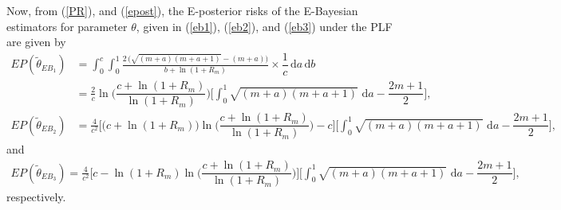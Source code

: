 \documentclass[twoside]{article}
\begin{document}
 Now, from (\ref{PR}), and (\ref{epost}), the E-posterior risks of the E-Bayesian estimators for parameter $\theta$, given in (\ref{eb1}), (\ref{eb2}), and (\ref{eb3}) under the PLF are given by
		\begin{align*}\nonumber
	 EP(\widetilde{\theta}_{EB_1})&=\int_0^c \int_0^1 \frac{2\, \big(\sqrt{(m+a)(m+a+1)}-(m+a)\big)}{b+\ln(1+R_m)}\times  \dfrac{1}{c} \,\mathrm{d}a \, \mathrm{d}b 
	\\&=\frac{2}{c}\ln\bigg(\dfrac{c+\ln(1+R_m)}{\ln(1+R_m)}\bigg) \bigg[\int_0^1   \sqrt{(m+a)(m+a+1)} \, \,\mathrm{d}a-\dfrac{2m+1}{2}\bigg],
\\
	 EP(\widetilde{\theta}_{EB_2})&=\frac{4}{c^2}\bigg[\big(c+\ln(1+R_m)\big)\ln\bigg(\dfrac{c+\ln(1+R_m)}{\ln(1+R_m)}\bigg) -c\bigg]
	 \bigg[\int_0^1   \sqrt{(m+a)(m+a+1)} \, \,\mathrm{d}a-\dfrac{2m+1}{2}\bigg],
	\end{align*}
and
		\begin{align*}\nonumber
	 EP(\widetilde{\theta}_{EB_3})=\frac{4}{c^2}\bigg[c- \ln(1+R_m)\ln\bigg(\dfrac{c+\ln(1+R_m)}{\ln(1+R_m)}\bigg)\bigg]\bigg[\int_0^1   \sqrt{(m+a)(m+a+1)} \, \,\mathrm{d}a-\dfrac{2m+1}{2}\bigg],
	\end{align*}
respectively.


\end{document}
